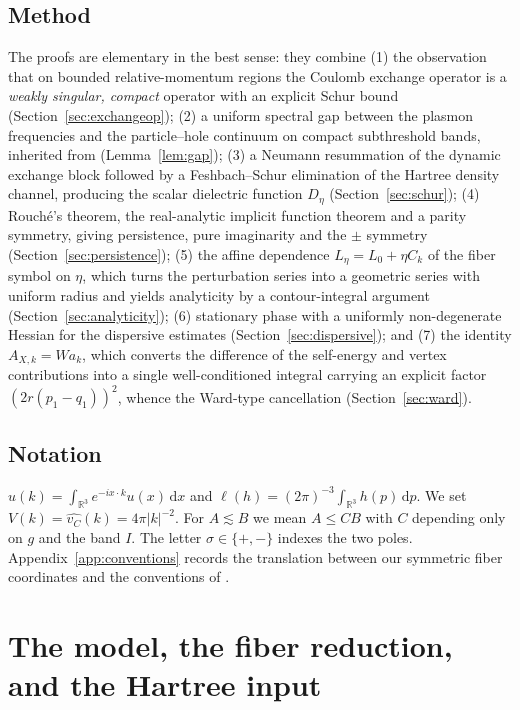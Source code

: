 \documentclass[11pt,a4paper]{amsart}
\theoremstyle{definition}
\theoremstyle{remark}
\newcommand{\R}{\mathbb{R}}
\newcommand{\dd}{\,\mathrm{d}}
\newcommand{\ellf}{\ell}
\begin{document}
\subsection{Method}
The proofs are elementary in the best sense: they combine (1) the observation that on bounded relative-momentum regions the Coulomb exchange operator is a \emph{weakly singular, compact} operator with an explicit Schur bound (Section~\ref{sec:exchangeop}); (2) a uniform spectral gap between the plasmon frequencies and the particle--hole continuum on compact subthreshold bands, inherited from \cite{NY1} (Lemma~\ref{lem:gap}); (3) a Neumann resummation of the dynamic exchange block followed by a Feshbach--Schur elimination of the Hartree density channel, producing the scalar dielectric function $D_\eta$ (Section~\ref{sec:schur}); (4) Rouch\'e's theorem, the real-analytic implicit function theorem and a parity symmetry, giving persistence, pure imaginarity and the $\pm$ symmetry (Section~\ref{sec:persistence}); (5) the affine dependence $L_\eta=L_0+\eta C_k$ of the fiber symbol on $\eta$, which turns the perturbation series into a geometric series with uniform radius and yields analyticity by a contour-integral argument (Section~\ref{sec:analyticity}); (6) stationary phase with a uniformly non-degenerate Hessian for the dispersive estimates (Section~\ref{sec:dispersive}); and (7) the identity $A_{X,k}=Wa_k$, which converts the difference of the self-energy and vertex contributions into a single well-conditioned integral carrying an explicit factor $(2r(p_1-q_1))^2$, whence the Ward-type cancellation (Section~\ref{sec:ward}).

\subsection*{Notation}
$\widehat u(k)=\int_{\R^3}e^{-ix\cdot k}u(x)\dd x$ and $\ellf(h)=(2\pi)^{-3}\int_{\R^3}h(p)\dd p$. We set $V(k)=\widehat{v_C}(k)=4\pi|k|^{-2}$. For $A\lesssim B$ we mean $A\le CB$ with $C$ depending only on $g$ and the band $I$. The letter $\sigma\in\{+,-\}$ indexes the two poles. Appendix~\ref{app:conventions} records the translation between our symmetric fiber coordinates and the conventions of \cite{NY1,NY2}.

\section{The model, the fiber reduction, and the Hartree input}\label{sec:model}
\end{document}
